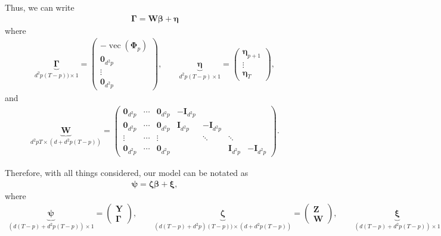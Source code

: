 \documentclass[fleqn]{article}
\begin{document}
Thus, we can write
\begin{align*}
    \bm \Gamma = \bm W \bm \beta + \bm \eta
\end{align*}
where
\begin{align*}
    \underbrace{\bm \Gamma}_{d^2p(T-p)) \times 1} = \begin{pmatrix}
        - \operatorname{vec}(\bm \Phi_p) \\
        \bm 0_{d^2p} \\
        \vdots \\
        \bm 0_{d^2p}
    \end{pmatrix},
    \qquad
    \underbrace{\bm \eta}_{d^2p(T-p) \times 1} = \begin{pmatrix}
        \bm \eta_{p+1} \\
        \vdots \\
        \bm \eta_T
    \end{pmatrix},
\end{align*}
and
\begin{align*}
    \underbrace{\bm W}_{d^2pT \times (d+d^2p(T-p))} = \begin{pmatrix}
        \bm 0_{d^2p} & \cdots & \bm 0_{d^2p} & - \bm I_{d^2p} &                &              &                \\
        \bm 0_{d^2p} & \cdots & \bm 0_{d^2p} &   \bm I_{d^2p} & - \bm I_{d^2p} &              &                \\
        \vdots       & \cdots & \vdots       &                & \ddots         & \ddots       &                \\
        \bm 0_{d^2p} & \cdots & \bm 0_{d^2p} &                &                & \bm I_{d^2p} & - \bm I_{d^2p}
    \end{pmatrix}.
\end{align*}

Therefore, with all things considered, our model can be notated as
\begin{align*}
    \bm \psi = \bm \zeta \bm \beta + \bm \xi,
\end{align*}
where
\begin{align*}
    \underbrace{\bm \psi}_{(d(T-p)+d^2p(T-p)) \times 1} = \begin{pmatrix}
        \bm Y \\
        \bm \Gamma
    \end{pmatrix},
    \qquad
    \underbrace{\bm \zeta}_{(d(T-p) + d^2p)(T-p)) \times (d + d^2p(T-p))}
    = \begin{pmatrix}
        \bm Z \\
        \bm W
    \end{pmatrix},
    \qquad
    \underbrace{\bm \xi}_{(d(T-p)+d^2p(T-p)) \times 1}
    = \begin{pmatrix}
        \bm \epsilon \\
        \bm \eta
    \end{pmatrix}.
\end{align*}
\end{document}
